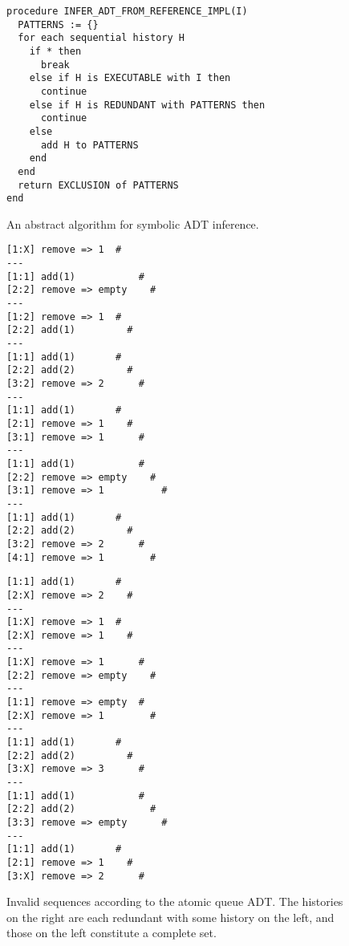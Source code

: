\begin{figure}
  \begin{verbatim}
procedure INFER_ADT_FROM_REFERENCE_IMPL(I)
  PATTERNS := {}
  for each sequential history H
    if * then
      break
    else if H is EXECUTABLE with I then
      continue
    else if H is REDUNDANT with PATTERNS then
      continue
    else
      add H to PATTERNS
    end
  end
  return EXCLUSION of PATTERNS
end
  \end{verbatim}
  \caption{An abstract algorithm for symbolic ADT inference.}
  \label{fig:abstract}
\end{figure}

\begin{figure}
  \begin{minipage}[b]{0.49\linewidth}
    \begin{verbatim}
[1:X] remove => 1  #
---
[1:1] add(1)           #
[2:2] remove => empty    #
---
[1:2] remove => 1  #
[2:2] add(1)         #
---
[1:1] add(1)       #
[2:2] add(2)         #
[3:2] remove => 2      #
---
[1:1] add(1)       #
[2:1] remove => 1    #
[3:1] remove => 1      #
---
[1:1] add(1)           #
[2:2] remove => empty    #
[3:1] remove => 1          #
---
[1:1] add(1)       #
[2:2] add(2)         #
[3:2] remove => 2      #
[4:1] remove => 1        #
    \end{verbatim}
  \end{minipage}
  \hfill
  \begin{minipage}[b]{0.49\linewidth}
    \begin{verbatim}
[1:1] add(1)       #
[2:X] remove => 2    #
---
[1:X] remove => 1  #
[2:X] remove => 1    #
---
[1:X] remove => 1      #
[2:2] remove => empty    #
---
[1:1] remove => empty  #
[2:X] remove => 1        #
---
[1:1] add(1)       #
[2:2] add(2)         #
[3:X] remove => 3      #
---
[1:1] add(1)           #
[2:2] add(2)             #
[3:3] remove => empty      #
---
[1:1] add(1)       #
[2:1] remove => 1    #
[3:X] remove => 2      #
    \end{verbatim}
  \end{minipage}
  \caption{Invalid sequences according to the atomic queue ADT. The histories
  on the right are each redundant with some history on the left, and those on
  the left constitute a complete set.}
  \label{fig:patterns}
\end{figure}

